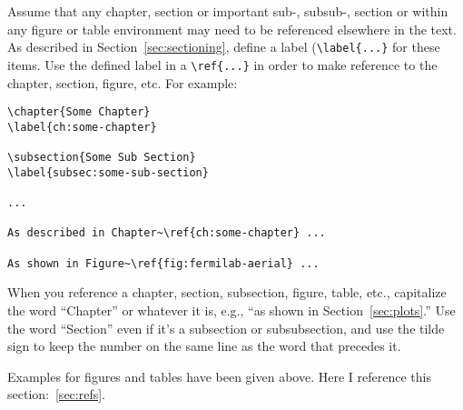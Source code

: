 Assume that any chapter, section or important sub-, subsub-, section
or within any figure or table environment may need to be referenced
elsewhere in the text. As described in Section~\ref{sec:sectioning},
define a label (\verb|\label{...}| for these items.
Use the defined label in a \verb|\ref{...}| in order to make reference
to the chapter, section, figure, etc.
For example:

\begin{verbatim}
\chapter{Some Chapter}
\label{ch:some-chapter}

\subsection{Some Sub Section}
\label{subsec:some-sub-section}

...

As described in Chapter~\ref{ch:some-chapter} ...

As shown in Figure~\ref{fig:fermilab-aerial} ...
\end{verbatim}

When you reference a chapter, section, subsection, figure, table,
etc., capitalize the word ``Chapter'' or whatever it is, e.g., ``as
shown in Section~\ref{sec:plots}.''
Use the word ``Section'' even if it's a subsection or subsubsection,
and use the tilde sign to keep the number on the same line as the word
that precedes it.

Examples for figures and tables have been given above.  Here I
reference this section:~\ref{sec:refs}.  



